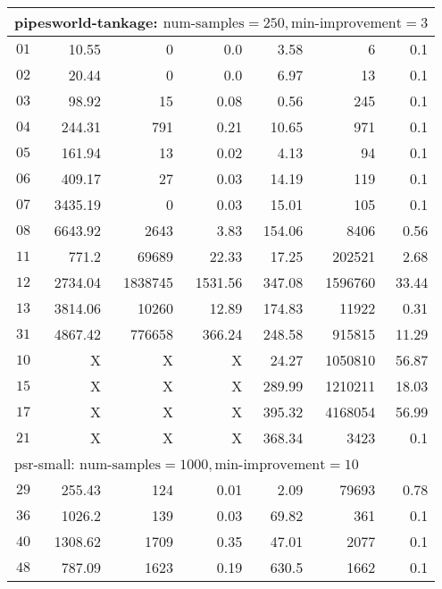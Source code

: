 \begin{longtable}{|c||r|r|r||r|r|r|}
\multicolumn{7}{|l|}{pipesworld-tankage: $\text{num-samples}=250,\text{min-improvement}=3$}\\\hline
$01$ & 10.55 & 0 & 0.0 & 3.58 & 6 & 0.1 \\\hline
$02$ & 20.44 & 0 & 0.0 & 6.97 & 13 & 0.1 \\\hline
$03$ & 98.92 & 15 & 0.08 & 0.56 & 245 & 0.1 \\\hline
$04$ & 244.31 & 791 & 0.21 & 10.65 & 971 & 0.1 \\\hline
$05$ & 161.94 & 13 & 0.02 & 4.13 & 94 & 0.1 \\\hline
$06$ & 409.17 & 27 & 0.03 & 14.19 & 119 & 0.1 \\\hline
$07$ & 3435.19 & 0 & 0.03 & 15.01 & 105 & 0.1 \\\hline
$08$ & 6643.92 & 2643 & 3.83 & 154.06 & 8406 & 0.56 \\\hline
$11$ & 771.2 & 69689 & 22.33 & 17.25 & 202521 & 2.68 \\\hline
$12$ & 2734.04 & 1838745 & 1531.56 & 347.08 & 1596760 & 33.44 \\\hline
$13$ & 3814.06 & 10260 & 12.89 & 174.83 & 11922 & 0.31 \\\hline
$31$ & 4867.42 & 776658 & 366.24 & 248.58 & 915815 & 11.29 \\\hline
$10$ &  X &  X &  X & 24.27 & 1050810 & 56.87 \\\hline
$15$ &  X &  X &  X & 289.99 & 1210211 & 18.03 \\\hline
$17$ &  X &  X &  X & 395.32 & 4168054 & 56.99 \\\hline
$21$ &  X &  X &  X & 368.34 & 3423 & 0.1 \\\hline

\multicolumn{7}{|l|}{psr-small: $\text{num-samples}=1000,\text{min-improvement}=10$}\\\hline
$29$ & 255.43 & 124 & 0.01 & 2.09 & 79693 & 0.78 \\\hline
$36$ & 1026.2 & 139 & 0.03 & 69.82 & 361 & 0.1 \\\hline
$40$ & 1308.62 & 1709 & 0.35 & 47.01 & 2077 & 0.1 \\\hline
$48$ & 787.09 & 1623 & 0.19 & 630.5 & 1662 & 0.1 \\\hline


\end{longtable}
